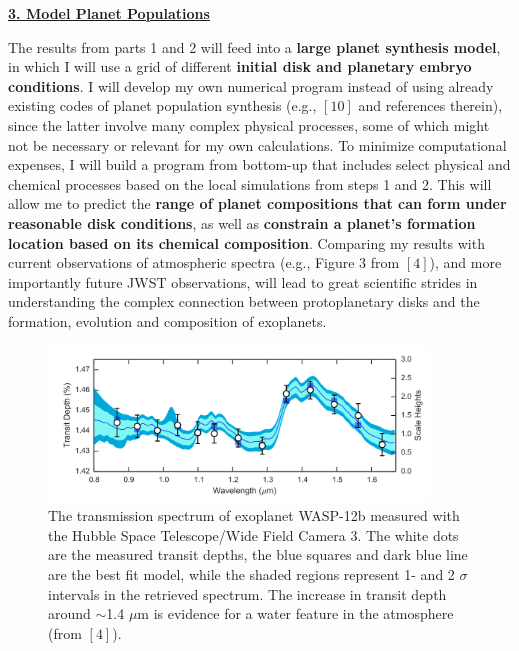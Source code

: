 \documentclass[12pt, letterpaper]{article}
\begin{document}
\vspace{0.2in}

\underline{\textbf{3. Model Planet Populations}}

The results from parts 1 and 2 will feed into a \textbf{large planet synthesis model}, in which I will use a grid of different \textbf{initial disk and planetary embryo conditions}. I will develop my own numerical program instead of using already existing codes of planet population synthesis (e.g., $[10]$ and references therein), since the latter involve many complex physical processes, some of which might not be necessary or relevant for my own calculations. To minimize computational expenses, I will build a program from bottom-up that includes select physical and chemical processes based on the local simulations from steps 1 and 2. This will allow me to predict the \textbf{range of planet compositions that can form under reasonable disk conditions}, as well as \textbf{constrain a planet's formation location based on its chemical composition}. Comparing my results with current observations of atmospheric spectra (e.g., Figure 3 from $[4]$), and more importantly future JWST observations, will lead to great scientific strides in understanding the complex connection between protoplanetary disks and the formation, evolution and composition of exoplanets. 

\begin{figure}[h!]
\centering
\vspace{-0.2in}
\includegraphics[width=0.9\textwidth]{water_spectrum}
\vspace{-0.2in}
\caption{The transmission spectrum of exoplanet WASP-12b measured with the Hubble Space Telescope/Wide Field Camera 3. The white dots are the measured transit depths, the blue squares and dark blue line are the best fit model, while the shaded regions represent 1- and 2 $\sigma$ intervals in the retrieved spectrum. The increase in transit depth around $\sim$1.4 $\mu$m is evidence for a water feature in the atmosphere (from $[4]$).}
\label{fig:HLTau}
\end{figure}
\end{document}
